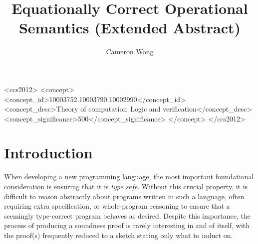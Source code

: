\documentclass[manuscript,screen,review,sigplan]{acmart}
\begin{document}
\title{Equationally Correct Operational Semantics (Extended Abstract)}

\author{Cameron Wong}

\renewcommand{\shortauthors}{Wong}

\begin{CCSXML}
<ccs2012>
<concept>
<concept_id>10003752.10003790.10002990</concept_id>
<concept_desc>Theory of computation~Logic and verification</concept_desc>
<concept_significance>500</concept_significance>
</concept>
</ccs2012>
\end{CCSXML}


\maketitle

\section{Introduction}

When developing a new programming language, the most important foundational
consideration is ensuring that it is \emph{type safe}. Without this crucial
property, it is difficult to reason abstractly about programs written in such
a language, often requiring extra specification, or whole-program reasoning to
ensure that a seemingly type-correct program behaves as desired. Despite this
importance, the process of producing a soundness proof is rarely interesting in
and of itself, with the proof(s) frequently reduced to a sketch stating only
what to induct on.
\end{document}
